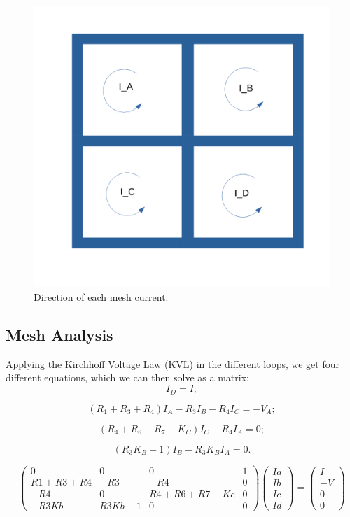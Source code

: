 \begin{figure}[h] \centering
\includegraphics[width=0.4\linewidth]{current.pdf}
\caption{Direction of each mesh current.}
\label{fig:current}
\end{figure}

\subsection{Mesh Analysis}


Applying the Kirchhoff Voltage Law (KVL) in the different loops, we get four different equations, which we can then solve as a matrix:
\begin{equation}
  I_D=I;
\end{equation}

\begin{equation}
  (R_1+R_3+R_4)I_A-R_3I_B-R_4I_C=-V_A;
\end{equation}

\begin{equation}
  (R_4+R_6+R_7-K_C)I_C-R_4I_A=0;
\end{equation}

\begin{equation}
  (R_3K_B-1)I_B-R_3K_BI_A=0.
\end{equation}

\begin{equation}
\begin{pmatrix}
0 & 0 & 0 & 1 \\
R1+R3+R4 & -R3 & -R4 & 0 \\
-R4 & 0 & R4+R6+R7-Kc & 0 \\
-R3Kb & R3Kb-1 & 0 & 0
\end{pmatrix}
\begin{pmatrix}
Ia\\
Ib\\
Ic\\
Id
\end{pmatrix}
=
\begin{pmatrix}
I\\
-V\\
0\\
0
\end{pmatrix}
\end{equation}



